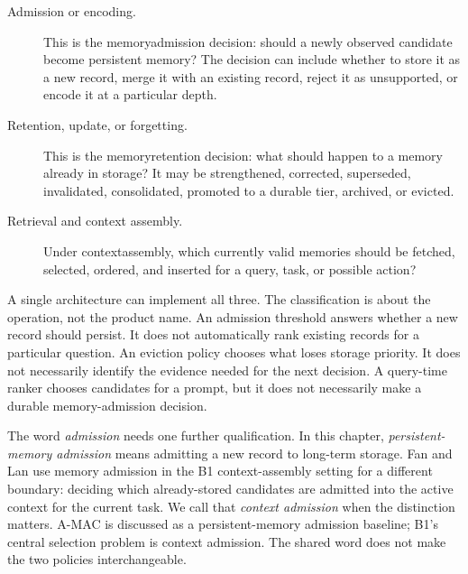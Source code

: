 \begin{description}
  \item[Admission or encoding.] This is the \gls{memoryadmission} decision: should a newly observed candidate become persistent memory? The decision can include whether to store it as a new record, merge it with an existing record, reject it as unsupported, or encode it at a particular depth.
  \item[Retention, update, or forgetting.] This is the \gls{memoryretention} decision: what should happen to a memory already in storage? It may be strengthened, corrected, superseded, invalidated, consolidated, promoted to a durable tier, archived, or evicted.
  \item[Retrieval and context assembly.] Under \gls{contextassembly}, which currently valid memories should be fetched, selected, ordered, and inserted for a query, task, or possible action?
\end{description}

A single architecture can implement all three. The classification is about the operation, not the product name. An admission threshold answers whether a new record should persist. It does not automatically rank existing records for a particular question. An eviction policy chooses what loses storage priority. It does not necessarily identify the evidence needed for the next decision. A query-time ranker chooses candidates for a prompt, but it does not necessarily make a durable memory-admission decision.

The word \emph{admission} needs one further qualification. In this chapter, \emph{persistent-memory admission} means admitting a new record to long-term storage. Fan and Lan use memory admission in the B1 context-assembly setting for a different boundary: deciding which already-stored candidates are admitted into the active context for the current task. We call that \emph{context admission} when the distinction matters. A-MAC is discussed as a persistent-memory admission baseline; B1's central selection problem is context admission. The shared word does not make the two policies interchangeable.

